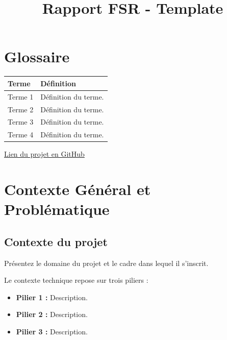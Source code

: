 \documentclass{rapportFSR}
\title{Rapport FSR - Template}
\begin{document}


\fairemarges
\fairepagedegarde
\tabledematieres
\newpage
\listoffigures
\newpage
\listoftables
\newpage

\section*{Glossaire}

\begin{table}[h]
\centering
\begin{tabular}{|l|p{10cm}|}
\hline
\textbf{Terme} & \textbf{Définition} \\
\hline
Terme 1 & Définition du terme. \\
\hline
Terme 2 & Définition du terme. \\
\hline
Terme 3 & Définition du terme. \\
\hline
Terme 4 & Définition du terme. \\
\hline
\end{tabular}
\end{table}


 \begin{center}
     \href{https://github.com/}{\color{blue}Lien du projet en GitHub}
 \end{center}


\newpage



\section{Contexte Général et Problématique}
\subsection{Contexte du projet}
Présentez le domaine du projet et le cadre dans lequel il s’inscrit.

Le contexte technique repose sur trois piliers :

\begin{itemize}[leftmargin=*,label=$\bullet$]
    \item \textbf{Pilier 1 :} Description.
    \item \textbf{Pilier 2 :} Description.
    \item \textbf{Pilier 3 :} Description.
\end{itemize}
\end{document}
